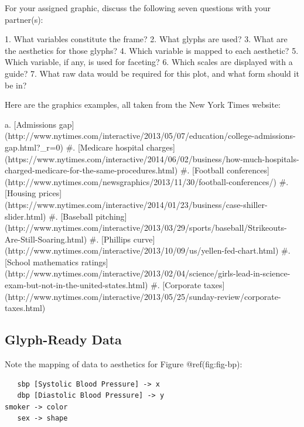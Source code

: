 \documentclass[
  letterpaper,
  DIV=11,
  numbers=noendperiod]{scrreprt}
\newenvironment{Shaded}{\begin{snugshade}}{\end{snugshade}}
\newcommand{\NormalTok}[1]{\textcolor[rgb]{0.00,0.23,0.31}{#1}}
\begin{document}
\begin{Shaded}
\begin{Highlighting}[]
\NormalTok{For your assigned graphic, discuss the following seven questions with your partner(s):}

\NormalTok{1. What variables constitute the frame?}
\NormalTok{2. What glyphs are used?}
\NormalTok{3. What are the aesthetics for those glyphs?}
\NormalTok{4. Which variable is mapped to each aesthetic?}
\NormalTok{5. Which variable, if any, is used for faceting?}
\NormalTok{6. Which scales are displayed with a guide?}
\NormalTok{7. What raw data would be required for this plot, and what form should it be in?}

\NormalTok{Here are the graphics examples, all taken from the New York Times website:}

\NormalTok{a. [Admissions gap](http://www.nytimes.com/interactive/2013/05/07/education/college{-}admissions{-}gap.html?\_r=0)}
\NormalTok{\#. [Medicare hospital charges](https://www.nytimes.com/interactive/2014/06/02/business/how{-}much{-}hospitals{-}charged{-}medicare{-}for{-}the{-}same{-}procedures.html)}
\NormalTok{\#. [Football conferences](http://www.nytimes.com/newsgraphics/2013/11/30/football{-}conferences/)}
\NormalTok{\#. [Housing prices](https://www.nytimes.com/interactive/2014/01/23/business/case{-}shiller{-}slider.html)}
\NormalTok{\#. [Baseball pitching](http://www.nytimes.com/interactive/2013/03/29/sports/baseball/Strikeouts{-}Are{-}Still{-}Soaring.html)}
\NormalTok{\#. [Phillips curve](http://www.nytimes.com/interactive/2013/10/09/us/yellen{-}fed{-}chart.html)}
\NormalTok{\#. [School mathematics ratings](http://www.nytimes.com/interactive/2013/02/04/science/girls{-}lead{-}in{-}science{-}exam{-}but{-}not{-}in{-}the{-}united{-}states.html)}
\NormalTok{\#. [Corporate taxes](http://www.nytimes.com/interactive/2013/05/25/sunday{-}review/corporate{-}taxes.html)}
\end{Highlighting}
\end{Shaded}

\subsection*{Glyph-Ready Data}\label{glyph-ready-data}

Note the mapping of data to aesthetics for Figure @ref(fig:fig-bp):

\begin{verbatim}
   sbp [Systolic Blood Pressure] -> x      
   dbp [Diastolic Blood Pressure] -> y     
smoker -> color
   sex -> shape
\end{verbatim}
\end{document}

